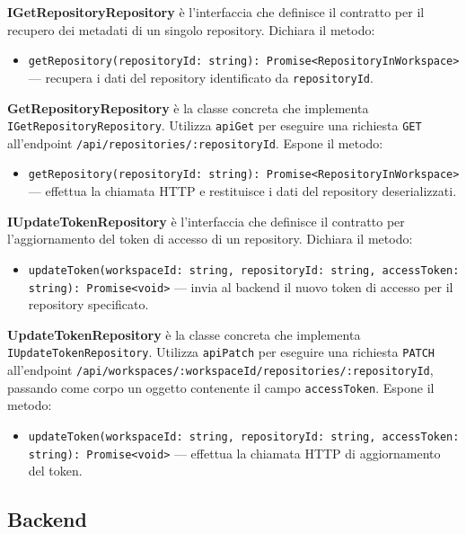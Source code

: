 \documentclass[a4paper, 11pt]{article}
\begin{document}
\textbf{IGetRepositoryRepository} è l'interfaccia che definisce il contratto per il recupero
dei metadati di un singolo repository. Dichiara il metodo:
\begin{itemize}
  \item \texttt{getRepository(repositoryId: string): Promise<RepositoryInWorkspace>} —
        recupera i dati del repository identificato da \texttt{repositoryId}.
\end{itemize}

\textbf{GetRepositoryRepository} è la classe concreta che implementa
\texttt{IGetRepositoryRepository}. Utilizza \texttt{apiGet} per eseguire una richiesta
\texttt{GET} all'endpoint \texttt{/api/repositories/:repositoryId}. Espone il metodo:
\begin{itemize}
  \item \texttt{getRepository(repositoryId: string): Promise<RepositoryInWorkspace>} —
        effettua la chiamata HTTP e restituisce i dati del repository deserializzati.
\end{itemize}

\textbf{IUpdateTokenRepository} è l'interfaccia che definisce il contratto per l'aggiornamento
del token di accesso di un repository. Dichiara il metodo:
\begin{itemize}
  \item \texttt{updateToken(workspaceId: string, repositoryId: string, accessToken: string):
        Promise<void>} — invia al backend il nuovo token di accesso per il repository
        specificato.
\end{itemize}

\textbf{UpdateTokenRepository} è la classe concreta che implementa
\texttt{IUpdateTokenRepository}. Utilizza \texttt{apiPatch} per eseguire una richiesta
\texttt{PATCH} all'endpoint
\texttt{/api/workspaces/:workspaceId/repositories/:repositoryId}, passando come corpo un
oggetto contenente il campo \texttt{accessToken}. Espone il metodo:
\begin{itemize}
  \item \texttt{updateToken(workspaceId: string, repositoryId: string, accessToken: string):
        Promise<void>} — effettua la chiamata HTTP di aggiornamento del token.
\end{itemize}

\newpage


\subsection{Backend}
\end{document}
